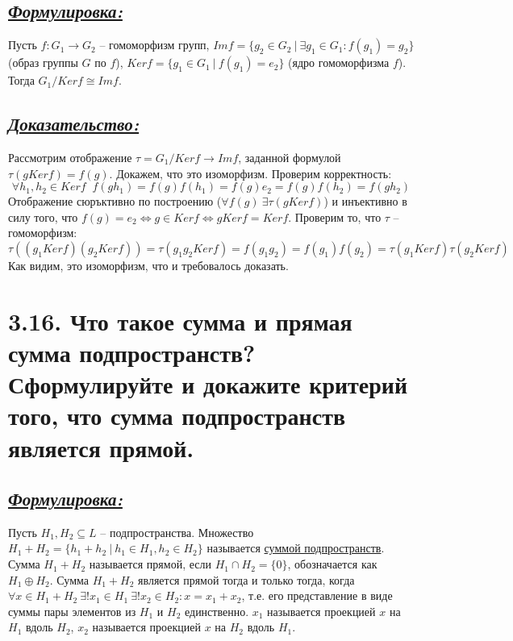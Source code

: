 \documentclass{article}
\begin{document}
\subsection*{\Large \underline{\textit{Формулировка: }}}

Пусть $f : G_1 \rightarrow G_2$ -- гомоморфизм групп,
\newline $Imf = \{g_2 \in G_2 \:|\: \exists g_1 \in G_1 : f(g_1) = g_2\}$ (образ группы $G$ по $f$), 
\newline $Kerf = \{g_1 \in G_1 \:|\: f(g_1) = e_2\}$ (ядро гомоморфизма $f$).
\newline Тогда $G_1/Kerf \cong Imf$.

\subsection*{\Large \underline{\textit{Доказательство: }}}

Рассмотрим отображение $\tau = G_1 / Kerf \rightarrow Imf$, заданной формулой $\tau(gKerf) = f(g)$. Докажем, что это изоморфизм.
\newline Проверим корректность:
$$ \forall h_1, h_2 \in Kerf \;\; f(gh_1) = f(g)f(h_1) = f(g)e_2 = f(g)f(h_2) = f(gh_2) $$
Отображение сюръктивно по построению ($\forall f(g) \: \exists \tau(gKerf)$) и инъективно в силу того, что $f(g) = e_2 \Leftrightarrow g\in Kerf \Leftrightarrow gKerf = Kerf$.
\newline Проверим то, что $\tau$ -- гомоморфизм:
$$
\tau((g_1Kerf)(g_2Kerf)) = \tau(g_1g_2Kerf) = f(g_1g_2) = f(g_1)f(g_2) = \tau(g_1Kerf)\tau(g_2Kerf)
$$
Как видим, это изоморфизм, что и требовалось доказать.

\section*{\LARGE 3.16. Что такое сумма и прямая сумма подпространств? Сформулируйте и докажите критерий того, что сумма подпространств является прямой. }
\subsection*{\Large \underline{\textit{Формулировка: }}}
Пусть $H_1, H_2 \subseteq L$ -- подпространства. Множество $H_1 + H_2 = \{h_1 + h_2 \:|\: h_1 \in H_1, h_2 \in H_2\}$ называется \underline{суммой подпространств}.
\newline Сумма $H_1 + H_2$ называется прямой, если $H_1 \cap H_2 = \{0\}$, обозначается как $H_1 \oplus H_2$.
\newline Сумма $H_1 + H_2$ является прямой тогда и только тогда, когда 
\newline $\forall x \in H_1 + H_2 \: \exists!x_1 \in H_1 \: \exists!x_2 \in H_2 : x = x_1 + x_2$, т.е. его представление в виде суммы пары элементов из $H_1$ и $H_2$ единственно. $x_1$ называется проекцией $x$ на $H_1$ вдоль $H_2$, $x_2$ называется проекцией $x$ на $H_2$ вдоль $H_1$.
\end{document}
